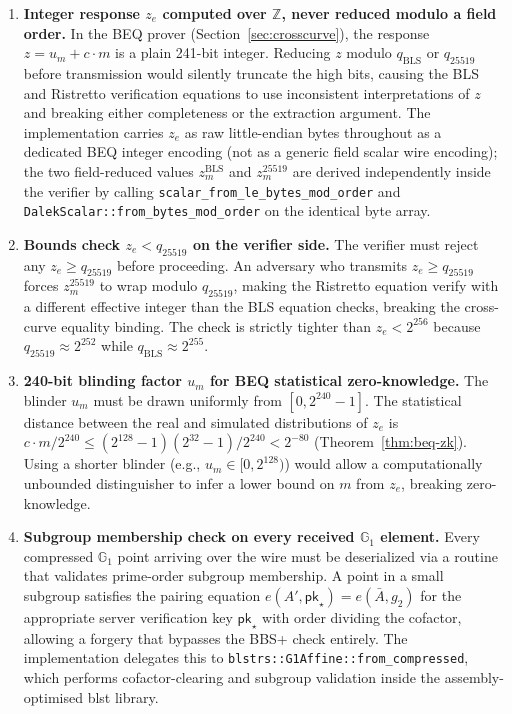 \documentclass[11pt]{article}
\theoremstyle{definitionstyle}
\theoremstyle{plain}
\begin{document}
\begin{enumerate}[leftmargin=*,label=\textbf{C\arabic*.}]

\item \textbf{Integer response $z_e$ computed over $\mathbb{Z}$, never reduced
  modulo a field order.}
  In the BEQ prover (Section~\ref{sec:crosscurve}), the response $z = u_m +
  c \cdot m$ is a plain 241-bit integer.  Reducing $z$ modulo $q_{\text{BLS}}$
  or $q_{25519}$ before transmission would silently truncate the high bits,
  causing the BLS and Ristretto verification equations to use inconsistent
  interpretations of $z$ and breaking either completeness or the extraction
  argument.  The implementation carries $z_e$ as raw little-endian bytes
  throughout as a dedicated BEQ integer encoding (not as a generic field
  scalar wire encoding); the two field-reduced values $z_m^{\text{BLS}}$ and
  $z_m^{25519}$ are derived independently inside the verifier by calling
  \texttt{scalar\_from\_le\_bytes\_mod\_order} and
  \texttt{DalekScalar::from\_bytes\_mod\_order} on the identical byte array.

\item \textbf{Bounds check $z_e < q_{25519}$ on the verifier side.}
  The verifier must reject any $z_e \ge q_{25519}$ before proceeding.  An
  adversary who transmits $z_e \ge q_{25519}$ forces $z_m^{25519}$ to wrap
  modulo $q_{25519}$, making the Ristretto equation verify with a different
  effective integer than the BLS equation checks, breaking the
  cross-curve equality binding.  The check is strictly tighter than
  $z_e < 2^{256}$ because $q_{25519} \approx 2^{252}$ while $q_{\text{BLS}}
  \approx 2^{255}$.

\item \textbf{240-bit blinding factor $u_m$ for BEQ statistical zero-knowledge.}
  The blinder $u_m$ must be drawn uniformly from $[0, 2^{240}-1]$.  The
  statistical distance between the real and simulated distributions of $z_e$
  is $c \cdot m / 2^{240} \le (2^{128}-1)(2^{32}-1)/2^{240} < 2^{-80}$
  (Theorem~\ref{thm:beq-zk}).  Using a shorter blinder (e.g., $u_m \in [0, 2^{128})$) would
  allow a computationally unbounded distinguisher to infer a lower bound on
  $m$ from $z_e$, breaking zero-knowledge.

\item \textbf{Subgroup membership check on every received $\mathbb{G}_1$ element.}
  Every compressed $\mathbb{G}_1$ point arriving over the wire must be
  deserialized via a routine that validates prime-order subgroup membership.
  A point in a small subgroup satisfies the pairing equation
  $e(A', \mathsf{pk}_{\star}) = e(\bar{A}, g_2)$ for the appropriate server
  verification key $\mathsf{pk}_{\star}$ with order dividing the cofactor,
  allowing a forgery that bypasses the BBS+ check entirely.  The
  implementation delegates this to \texttt{blstrs::G1Affine::from\_compressed},
  which performs cofactor-clearing and subgroup validation inside the
  assembly-optimised blst library.


\end{enumerate}
\end{document}
